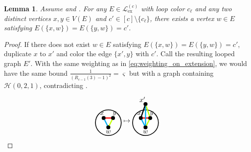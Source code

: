\documentclass[a4paper,11pt]{article}
\newtheorem{lemma}[theorem]{Lemma}
\numberwithin{equation}{section}
\newcommand{\mL}{\mathcal{L}}
\newcommand{\mH}{\mathcal{H}}
\newcommand{\boxedchar}[1]{
    \hspace{-2pt}\tikz[baseline=(char.base)]{
        \node[shape=rectangle, fill=black, rounded corners=1.5pt, text=white, inner xsep=3pt, inner xsep=3pt, inner ysep=2pt] (char) {\normalfont #1};
    }\hspace{-2pt}
}
\begin{document}
\begin{lemma}\label{lem:exists_cherry_in_Ramsey}
     Assume \boxedchar{A1} and \boxedchar{A2}. For any $E \in \mL_{\operatorname{ex}}^{(c)}$ with loop color $c_\ell$ and any two distinct vertices $x,y\in V(E)$ and $c'\in [c]\setminus \{c_\ell\}$,
    there exists
    a vertex $w\in E$ 
    satisfying $E(\{x,w\})=E(\{y,w\})=c'$.
\end{lemma}
\begin{proof}
    If there does not exist $w\in E$ 
    satisfying $E(\{x,w\})=E(\{y,w\})=c'$, duplicate $x$ to $x'$ and color the edge $\{x', y\}$ with $c'$.  Call the resulting looped graph $E'$. With the same weighting as in \cref{eq:weighting_on_extension}, we would have the same 
    bound $\frac{1}{(R_{c-1}(3)-1)^2}=\varsigma$ but with a graph containing $\mH(0,2,1)$, contradicting \boxedchar{A2}.
$$
   \begin{tikzpicture}[line width=0.4mm,baseline=0ex, scale=0.8]
        \node[circle,fill=white,draw,scale=4] (A) at (0,0) {};
        \node[circle,fill=black,draw,scale=0.5] (Ap1) at (-0.3,0.3) {};
        \node[circle,fill=black,draw,scale=0.5] (Ap2) at (0.3,0.3) {};
        \node[circle,fill=black,draw,scale=0.5] (Ap3) at (0,-0.3) {};

        \draw[lime, line width=0.6mm] (Ap2) -- (Ap3);
        \draw[cyan, line width=0.6mm] (Ap1) -- (Ap3);
        \draw[red, line width=0.6mm] (Ap1) -- (Ap2);


        \node at (0.4, 0.6) {$y$};
        \node at (-0.4, 0.6) {$x$};
        \node at (0, -0.6) {$w$};
    \end{tikzpicture}
    \mapsto
   \begin{tikzpicture}[line width=0.4mm,baseline=0ex, scale=0.8]
        \node[circle,fill=white,draw,scale=4] (A) at (0,0) {};
        \node[circle,fill=black,draw,scale=0.5] (Ap1) at (-0.3,0.3) {};
        \node[circle,fill=black,draw,scale=0.5] (Ap2) at (0.3,0.3) {};
        \node[circle,fill=black,draw,scale=0.5] (Ap3) at (0,-0.3) {};
        \node[circle,fill=black,draw,scale=0.5] (Ap4) at (0,1.2) {};

        \draw[lime, line width=0.6mm] (Ap2) -- (Ap3);
        \draw[cyan, line width=0.6mm] (Ap1) -- (Ap3);
        \draw[red, line width=0.6mm] (Ap1) -- (Ap2);
        \draw[lime, line width=0.6mm] (Ap2) -- (Ap4);
        \draw[cyan, line width=0.6mm] (Ap3) -- (Ap4);
        \draw[black, line width=0.6mm] (Ap1) -- (Ap4);


        \node at (0.4, 0.6) {$y$};
        \node at (-0.4, 0.6) {$x$};
        \node at (0, -0.6) {$w$};
        \node at (-0.2, 1.5) {$x'$};
    \end{tikzpicture}
$$
\end{proof}
\end{document}
